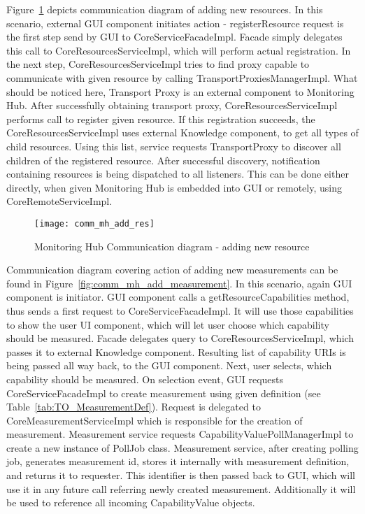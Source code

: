 Figure~\ref{fig:comm_mh_add_res} depicts communication diagram of adding new resources. In this scenario, external GUI component initiates action - registerResource request is the first step send by GUI to CoreServiceFacadeImpl. Facade simply delegates this call to CoreResourcesServiceImpl, which will perform actual registration. In the next step, CoreResourcesServiceImpl tries to find proxy capable to communicate with given resource by calling TransportProxiesManagerImpl. What should be noticed here, Transport Proxy is an external component to Monitoring Hub. After successfully obtaining transport proxy, CoreResourcesServiceImpl performs call to register given resource. If this registration succeeds, the CoreResourcesServiceImpl uses external Knowledge component, to get all types of child resources. Using this list, service requests TransportProxy to discover all children of the registered resource. After successful discovery, notification containing resources is being dispatched to all listeners. This can be done either directly, when given Monitoring Hub is embedded into GUI or remotely, using CoreRemoteServiceImpl.

\begin{figure}[ht]
\centering
\texttt{[image: comm\_mh\_add\_res]}
\caption{Monitoring Hub Communication diagram - adding new resource}
\label{fig:comm_mh_add_res}
\end{figure}

Communication diagram covering action of adding new measurements can be found in Figure~\ref{fig:comm_mh_add_measurement}. In this scenario, again GUI component is initiator. GUI component calls a getResourceCapabilities method, thus sends a first request to CoreServiceFacadeImpl. It will use those capabilities to show the user UI component, which will let user choose which capability should be measured. Facade delegates query to CoreResourcesServiceImpl, which passes it to external Knowledge component. Resulting list of capability URIs is being passed all way back, to the GUI component. Next, user selects, which capability should be measured. On selection event, GUI requests CoreServiceFacadeImpl to create measurement using given definition (see Table~\ref{tab:TO_MeasurementDef}). Request is delegated to CoreMeasurementServiceImpl which is responsible for the creation of measurement. Measurement service requests CapabilityValuePollManagerImpl to create a new instance of PollJob class. Measurement service, after creating polling job, generates measurement id, stores it internally with measurement definition, and returns it to requester. This identifier is then passed back to GUI, which will use it in any future call referring newly created measurement. Additionally it will be used to reference all incoming CapabilityValue objects.

